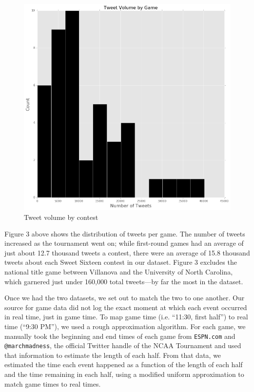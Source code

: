 \documentclass[12pt]{article}
\begin{document}
\begin{doublespacing}
\begin{figure} [H]
	\centering
	\includegraphics[scale = 0.4] {Images/TweetVolumeByGame.png} 
	\caption{Tweet volume by contest}
\end{figure}

Figure 3 above shows the distribution of tweets per game. The number of tweets increased as the tournament went on; while first-round games had an average of just about 12.7 thousand tweets a contest, there were an average of 15.8 thousand tweets about each Sweet Sixteen contest in our dataset. Figure 3 excludes the national title game between Villanova and the University of North Carolina, which garnered just under 160,000 total tweets---by far the most in the dataset. 

Once we had the two datasets, we set out to match the two to one another. Our source for game data did not log the exact moment at which each event occurred in real time, just in game time. To map game time (i.e. ``11:30, first half'') to real time (``9:30 PM''), we used a rough approximation algorithm. For each game, we manually took the beginning and end times of each game from \texttt{ESPN.com} and \texttt{@marchmadness}, the official Twitter handle of the NCAA Tournament and used that information to estimate the length of each half. From that data, we estimated the time each event happened as a function of the length of each half and the time remaining in each half, using a modified uniform approximation to match game times to real times. 


\end{doublespacing}
\end{document}

